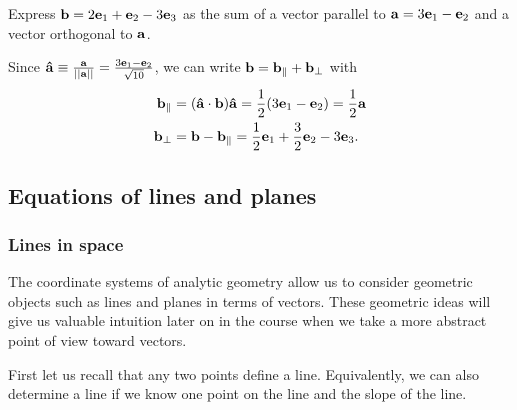 \documentclass[12pt,letterpaper,reqno]{article}
\numberwithin{equation}{section}
\begin{document}
\begin{example}
	Express ${\bf b}=2{\bf e}_1+{\bf e}_2-3{\bf e}_3$ as the sum of a vector parallel to ${\bf a}=3{\bf e}_1-{\bf e}_2$ and a vector orthogonal to ${\bf a}$.
\end{example}

{\color{red} 
Since ${\bf \hat{a}}\equiv \frac{{\bf a}}{||{\bf a}||}=\frac{3{\bf e}_1-{\bf e}_2}{\sqrt{10}}$, we can write ${\bf b}={\bf b}_{\parallel}+{\bf b}_{\perp}$ with  
\begin{align*}
	{\bf b}_{\parallel}&=({\bf \hat{a}}\cdot {\bf b}){\bf {\hat{a}}}=\frac{1}{2}(3{\bf e}_1-{\bf e}_2)=\frac{1}{2}{\bf a} \\
	{\bf b}_{\perp}&={\bf b}-{\bf b}_{\parallel}=\frac{1}{2}{\bf e}_1+\frac{3}{2}{\bf e}_2-3{\bf e}_3.
\end{align*}}

\subsection{Equations of lines and planes}
\subsubsection{Lines in space}
The coordinate systems of analytic geometry allow us to consider geometric objects such as lines and planes in terms of vectors. These geometric ideas will give us valuable intuition later on in the course when we take a more abstract point of view toward vectors.

First let us recall that any two points define a line. Equivalently, we can also determine a line if we know one point on the line and the slope of the line. 
\end{document}

